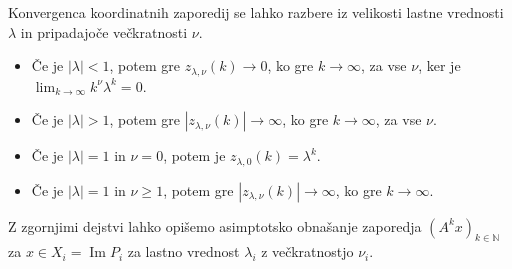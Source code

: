 \documentclass[mat1]{fmfdelo}
\newcommand{\N}{\mathbb N}
\DeclareMathOperator{\Ima}{Im}
\begin{document}
Konvergenca koordinatnih zaporedij se lahko razbere iz velikosti lastne vrednosti $\lambda$ in pripadajoče večkratnosti $\nu$.
\begin{itemize}
    \item Če je $|\lambda| < 1$, potem gre $z_{\lambda, \nu} (k) \rightarrow 0$, ko gre $k \rightarrow \infty$, za vse $\nu$, ker je $\lim_{k \rightarrow \infty} k^\nu \lambda^k = 0$.
    \item Če je $|\lambda| > 1$, potem gre $|z_{\lambda, \nu} (k)| \rightarrow \infty$, ko gre $k \rightarrow \infty$, za vse $\nu$.
    \item Če je $|\lambda| = 1$ in $\nu = 0$, potem je $z_{\lambda, 0} (k) = \lambda^k$.
    \item Če je $|\lambda| = 1$ in $\nu \geq 1$, potem gre $|z_{\lambda, \nu} (k)| \rightarrow \infty$, ko gre $k \rightarrow \infty$.
\end{itemize}
Z zgornjimi dejstvi lahko opišemo asimptotsko obnašanje zaporedja $(A^k x)_{k\in\N}$ za $x \in X_i = \Ima P_i$ za lastno vrednost $\lambda_i$ z večkratnostjo $\nu_i$.
\end{document}
